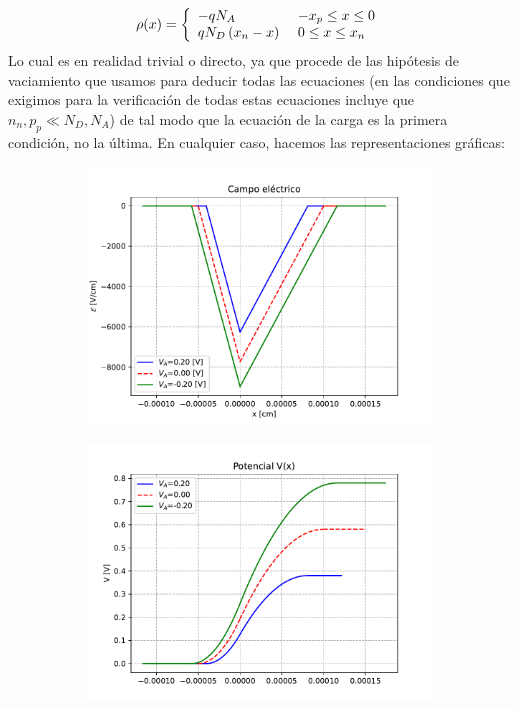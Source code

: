\begin{enumerate}[label=\alph*)]
    \begin{equation}
        \rho (x) = \left\lbrace \begin{array}{ll}
            - q N_A   & \ - x_p \leq x \leq 0 \\
            q N_D \left( x_n - x \right) & \ 0 \leq x \leq x_n \\
        \end{array} \right.
    \end{equation}
    Lo cual es en realidad trivial o directo, ya que procede de las hipótesis de vaciamiento que usamos para deducir todas las ecuaciones (en las condiciones que exigimos para la verificación de todas estas ecuaciones incluye que $n_n,p_p\ll N_D,N_A$) de tal modo que la ecuación de la carga es la primera condición, no la última. En cualquier caso, hacemos las representaciones gráficas:   
    \begin{figure}[h!]
    \centering
    \begin{subfigure}{0.47\textwidth}
        \includegraphics[width=\textwidth]{Ejercicios/Ch_03/03_04_E.pdf}
    \end{subfigure}
    \begin{subfigure}{0.47\textwidth}
        \includegraphics[width=\textwidth]{Ejercicios/Ch_03/03_05_V.pdf}

\end{subfigure}
\end{figure}
\end{enumerate}
